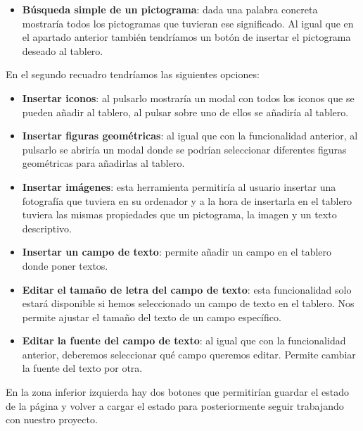 \begin{itemize}
\begin{itemize}
		\item \textbf{Búsqueda simple de un pictograma}: dada una palabra concreta mostraría todos los pictogramas que tuvieran ese significado. Al igual que en el apartado anterior también tendríamos un botón de insertar el pictograma deseado al tablero.
	
	\end{itemize}

En el segundo recuadro tendríamos las siguientes opciones:

	\begin{itemize}
	
		\item \textbf{Insertar iconos}: al pulsarlo mostraría un modal con todos los iconos que se pueden añadir al tablero, al pulsar sobre uno de ellos se añadiría al tablero.
		
		\item \textbf{Insertar figuras geométricas}: al igual que con la funcionalidad anterior, al pulsarlo se abriría un modal donde se podrían seleccionar diferentes figuras geométricas para añadirlas al tablero.
		
		\item \textbf{Insertar imágenes}: esta herramienta permitiría al usuario insertar una fotografía que tuviera en su ordenador y a la hora de insertarla en el tablero tuviera las mismas propiedades que un pictograma, la imagen y un texto descriptivo.
		
		\item \textbf{Insertar un campo de texto}: permite añadir un campo en el tablero donde poner textos.
		
		\item \textbf{Editar el tamaño de letra del campo de texto}: esta funcionalidad solo estará disponible si hemos seleccionado un campo de texto en el tablero. Nos permite ajustar el tamaño del texto de un campo específico.
		
		\item \textbf{Editar la fuente del campo de texto}: al igual que con la funcionalidad anterior, deberemos seleccionar qué campo queremos editar. Permite cambiar la fuente del texto por otra.
		
	\end{itemize}
	
	
	En la zona inferior izquierda hay dos botones que permitirían guardar el estado de la página y volver a cargar el estado para posteriormente seguir trabajando con nuestro proyecto.
	

\end{itemize}
